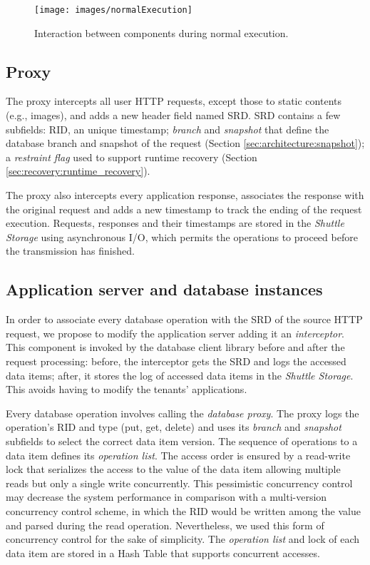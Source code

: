 \documentclass[10pt,conference]{IEEEtran}
\begin{document}
\begin{figure}
  \centering
  \texttt{[image: images/normalExecution]}
  \caption{Interaction between components during normal execution.}
  \label{fig:normal_execution}
\end{figure}


\subsection{Proxy}
\label{sec:architecture:proxy}

The proxy intercepts all user HTTP requests, except those to static contents (e.g., images), and adds a new header field named \acf{SRD}. \ac{SRD} contains a few subfields: \acf{RID}, an unique timestamp; \emph{branch} and \emph{snapshot} that define the database branch and snapshot of the request (Section \ref{sec:architecture:snapshot}); a \emph{restraint flag} used to support runtime recovery (Section \ref{sec:recovery:runtime_recovery}). 

The proxy also intercepts every application response, associates the response with the original request and adds a new timestamp to track the ending of the request execution. Requests, responses and their timestamps are stored in the \emph{Shuttle Storage} using asynchronous I/O, which permits the operations to proceed before the transmission has finished. 


\subsection{Application server and database instances}
\label{sec:architecture:database}

In order to associate every database operation with the \ac{SRD} of the source HTTP request, we propose to modify the application server adding it an \emph{interceptor}. This component is invoked by the database client library before and after the request processing: before, the interceptor gets the \ac{SRD} and logs the accessed data items; after, it stores the log of accessed data items in the \emph{Shuttle Storage}. This avoids having to modify the tenants' applications.

Every database operation involves calling the \emph{database proxy}. The proxy logs the operation's \ac{RID} and type (put, get, delete) and uses its \emph{branch} and \emph{snapshot} subfields to select the correct data item version. The sequence of operations to a data item defines its \emph{operation list}.  
The access order is ensured by a read-write lock that serializes the access to the value of the data item allowing multiple reads but only a single write concurrently. This pessimistic concurrency control may decrease the system performance in comparison with a multi-version concurrency control scheme, in which the \ac{RID} would be written among the value and parsed during the read operation. Nevertheless, we used this form of concurrency control for the sake of simplicity.
The \emph{operation list} and lock of each data item are stored in a Hash Table that supports concurrent accesses.
\end{document}
